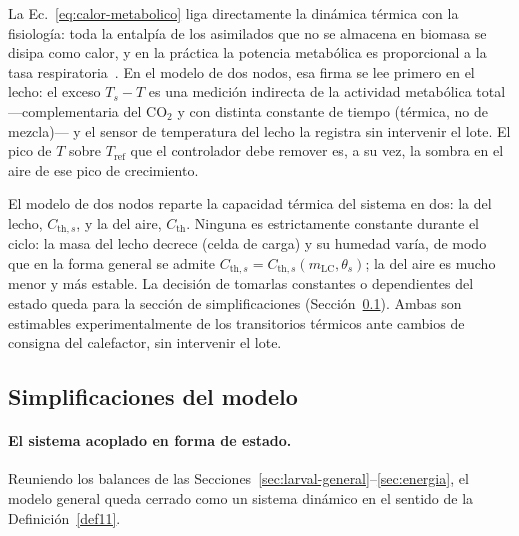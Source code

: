 \begin{remark}
\label{rem:calor-firma}
La Ec.~\eqref{eq:calor-metabolico} liga directamente la din\'amica t\'ermica con la fisiolog\'ia: toda la entalp\'ia de los asimilados que no se almacena en biomasa se disipa como calor, y en la pr\'actica la potencia metab\'olica es proporcional a la tasa respiratoria~\citep{hansenUseCalorespirometricRatios2004}. En el modelo de dos nodos, esa firma se lee primero en el lecho: el exceso $T_s - T$ es una medici\'on indirecta de la actividad metab\'olica total ---complementaria del CO$_2$ y con distinta constante de tiempo (t\'ermica, no de mezcla)--- y el sensor de temperatura del lecho la registra sin intervenir el lote. El pico de $T$ sobre $T_{\mathrm{ref}}$ que el controlador debe remover es, a su vez, la sombra en el aire de ese pico de crecimiento.
\end{remark}

\begin{remark}
\label{rem:cth}
El modelo de dos nodos reparte la capacidad t\'ermica del sistema en dos: la del lecho, $C_{\mathrm{th},s}$, y la del aire, $C_{\mathrm{th}}$. Ninguna es estrictamente constante durante el ciclo: la masa del lecho decrece (celda de carga) y su humedad var\'ia, de modo que en la forma general se admite $C_{\mathrm{th},s} = C_{\mathrm{th},s}(m_{\mathrm{LC}}, \theta_s)$; la del aire es mucho menor y m\'as estable. La decisi\'on de tomarlas constantes o dependientes del estado queda para la secci\'on de simplificaciones (Secci\'on~\ref{sec:simplificaciones}). Ambas son estimables experimentalmente de los transitorios t\'ermicos ante cambios de consigna del calefactor, sin intervenir el lote.
\end{remark}

\subsection{Simplificaciones del modelo}
\label{sec:simplificaciones}

\paragraph{El sistema acoplado en forma de estado.} Reuniendo los balances de las Secciones~\ref{sec:larval-general}--\ref{sec:energia}, el modelo general queda cerrado como un sistema din\'amico en el sentido de la Definici\'on~\ref{def11}.

